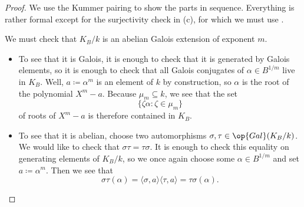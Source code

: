 \documentclass[notes.tex]{subfiles}
\begin{document}
\begin{proof}
	We use the Kummer pairing to show the parts in sequence. Everything is rather formal except for the surjectivity check in (c), for which we must use \Cref{lem:classify-cyclic-kummer}.
	\begin{listalph}
		\item We must check that $K_B/k$ is an abelian Galois extension of exponent $m$.
		\begin{itemize}
			\item To see that it is Galois, it is enough to check that it is generated by Galois elements, so it is enough to check that all Galois conjugates of $\alpha\in B^{1/m}$ live in $K_B$. Well, $a\coloneqq\alpha^m$ is an element of $k$ by construction, so $\alpha$ is the root of the polynomial $X^m-a$. Because $\mu_m\subseteq k$, we see that the set
			\[\{\zeta\alpha:\zeta\in\mu_m\}\]
			of roots of $X^m-a$ is therefore contained in $K_B$. 
			\item To see that it is abelian, choose two automorphisms $\sigma,\tau\in\op{Gal}(K_B/k)$. We would like to check that $\sigma\tau=\tau\sigma$. It is enough to check this equality on generating elements of $K_B/k$, so we once again choose some $\alpha\in B^{1/m}$ and set $a\coloneqq\alpha^m$. Then we see that
			\[\sigma\tau(\alpha)=\langle\sigma,a\rangle\langle\tau,a\rangle=\tau\sigma(\alpha).\]
		\end{itemize}
		\item %

\end{listalph}
\end{proof}
\end{document}
